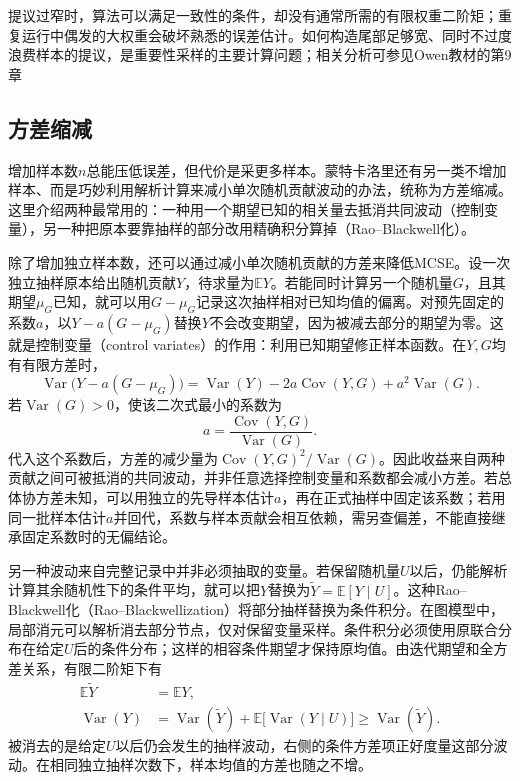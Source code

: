 提议过窄时，算法可以满足一致性的条件，却没有通常所需的有限权重二阶矩；重复运行中偶发的大权重会破坏熟悉的误差估计。如何构造尾部足够宽、同时不过度浪费样本的提议，是重要性采样的主要计算问题；相关分析可参见Owen教材的第9章

\subsection{方差缩减}
\label{sec:pgm-sampling-variance-reduction}

增加样本数$n$总能压低误差，但代价是采更多样本。蒙特卡洛里还有另一类不增加样本、而是巧妙利用解析计算来减小单次随机贡献波动的办法，统称为方差缩减。这里介绍两种最常用的：一种用一个期望已知的相关量去抵消共同波动（控制变量），另一种把原本要靠抽样的部分改用精确积分算掉（Rao–Blackwell化）。

除了增加独立样本数，还可以通过减小单次随机贡献的方差来降低MCSE。设一次独立抽样原本给出随机贡献$Y$，待求量为$\mathbb{E}Y$。若能同时计算另一个随机量$G$，且其期望$\mu_G$已知，就可以用$G-\mu_G$记录这次抽样相对已知均值的偏离。对预先固定的系数$a$，以$Y-a(G-\mu_G)$替换$Y$不会改变期望，因为被减去部分的期望为零。这就是控制变量（control variates）的作用：利用已知期望修正样本函数。在$Y,G$均有有限方差时，
\[
  \operatorname{Var}\bigl(Y-a(G-\mu_G)\bigr)
    =\operatorname{Var}(Y)-2a\operatorname{Cov}(Y,G)
       +a^2\operatorname{Var}(G).
\]
若$\operatorname{Var}(G)>0$，使该二次式最小的系数为
\[
  a=\frac{\operatorname{Cov}(Y,G)}{\operatorname{Var}(G)}.
\]
代入这个系数后，方差的减少量为$\operatorname{Cov}(Y,G)^2/\operatorname{Var}(G)$。因此收益来自两种贡献之间可被抵消的共同波动，并非任意选择控制变量和系数都会减小方差。若总体协方差未知，可以用独立的先导样本估计$a$，再在正式抽样中固定该系数；若用同一批样本估计$a$并回代，系数与样本贡献会相互依赖，需另查偏差，不能直接继承固定系数时的无偏结论。

另一种波动来自完整记录中并非必须抽取的变量。若保留随机量$U$以后，仍能解析计算其余随机性下的条件平均，就可以把$Y$替换为$\widetilde Y=\mathbb{E}[Y\mid U]$。这种Rao--Blackwell化（Rao--Blackwellization）将部分抽样替换为条件积分。在图模型中，局部消元可以解析消去部分节点，仅对保留变量采样。条件积分必须使用原联合分布在给定$U$后的条件分布；这样的相容条件期望才保持原均值。由迭代期望和全方差关系，有限二阶矩下有
\[
  \begin{aligned}
    \mathbb{E}\widetilde Y&=\mathbb{E}Y,\\
    \operatorname{Var}(Y)
      &=\operatorname{Var}(\widetilde Y)
        +\mathbb{E}\bigl[\operatorname{Var}(Y\mid U)\bigr]
       \geq\operatorname{Var}(\widetilde Y).
  \end{aligned}
\]
被消去的是给定$U$以后仍会发生的抽样波动，右侧的条件方差项正好度量这部分波动。在相同独立抽样次数下，样本均值的方差也随之不增。


